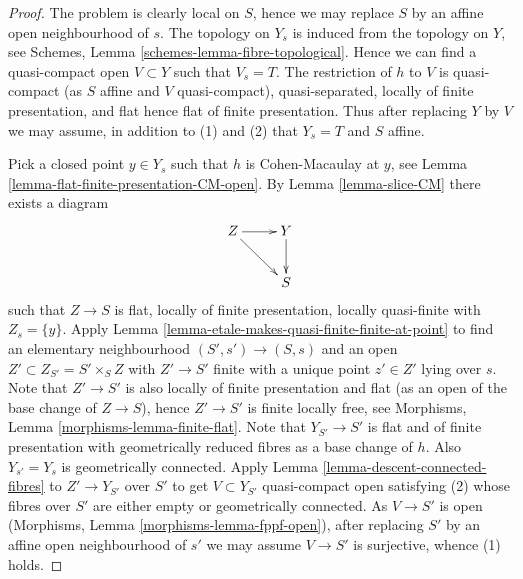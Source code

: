 \documentclass[10pt,a4paper]{amsart}
\theoremstyle{plain}
\theoremstyle{definition}
\theoremstyle{remark}
\numberwithin{equation}{subsection}
\begin{document}
\begin{proof}
The problem is clearly local on $S$, hence we may replace $S$ by an
affine open neighbourhood of $s$.
The topology on $Y_s$ is induced from the topology on $Y$, see
Schemes, Lemma \ref{schemes-lemma-fibre-topological}.
Hence we can find a quasi-compact open $V \subset Y$ such that $V_s = T$.
The restriction of $h$ to $V$ is quasi-compact (as $S$ affine and $V$
quasi-compact), quasi-separated, locally of finite presentation, and
flat hence flat of finite presentation.
Thus after replacing $Y$ by $V$ we may assume, in addition
to (1) and (2) that $Y_s = T$ and $S$ affine.

\medskip\noindent
Pick a closed point $y \in Y_s$ such that $h$ is Cohen-Macaulay at $y$, see
Lemma \ref{lemma-flat-finite-presentation-CM-open}.
By
Lemma \ref{lemma-slice-CM}
there exists a diagram
$$
\xymatrix{
Z \ar[r] \ar[rd] & Y \ar[d] \\
& S
}
$$
such that $Z \to S$ is flat, locally of finite presentation, locally
quasi-finite with $Z_s = \{y\}$. Apply
Lemma \ref{lemma-etale-makes-quasi-finite-finite-at-point}
to find an elementary neighbourhood $(S', s') \to (S, s)$ and an open
$Z' \subset Z_{S'} = S' \times_S Z$ with $Z' \to S'$ finite with a unique
point $z' \in Z'$ lying over $s$. Note that $Z' \to S'$ is also
locally of finite presentation and flat (as an open of the base change
of $Z \to S$), hence $Z' \to S'$ is finite locally free, see
Morphisms, Lemma \ref{morphisms-lemma-finite-flat}.
Note that $Y_{S'} \to S'$ is flat and of finite presentation
with geometrically reduced fibres as a base change of $h$.
Also $Y_{s'} = Y_s$ is geometrically connected.
Apply Lemma \ref{lemma-descent-connected-fibres}
to $Z' \to Y_{S'}$ over $S'$ to get $V \subset Y_{S'}$ quasi-compact open
satisfying (2) whose fibres over $S'$ are either empty or
geometrically connected. As $V \to S'$ is open
(Morphisms, Lemma \ref{morphisms-lemma-fppf-open}), after replacing
$S'$ by an affine open neighbourhood of $s'$
we may assume $V \to S'$ is surjective, whence (1) holds.
\end{proof}
\end{document}
